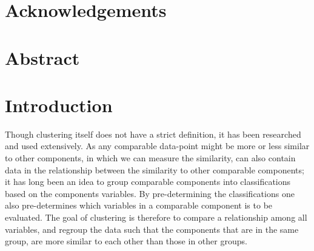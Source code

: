 \documentclass[a4paper]{article}
\begin{document}
%
%


%
%
\section*{Acknowledgements}
\newpage

%
%
\section*{Abstract}
\newpage

%
%
\tableofcontents
\newpage

%
%
\listofalgorithms
\newpage



%
%
\section{Introduction}
Though clustering itself does not have a strict definition, it has been researched and used 
extensively. As any comparable data-point might be more or less similar to other components, 
in which we can measure the similarity, can also contain data in the relationship between the 
similarity to other comparable components; it has long been an idea to group comparable 
components into classifications based on the components variables. By pre-determining the 
classifications one also pre-determines which variables in a comparable component is to be 
evaluated. The goal of clustering is therefore to compare a relationship among all variables, 
and regroup the data such that the components that are in the same group, are more similar 
to each other than those in other groups. \cite{gan07}
\end{document}
